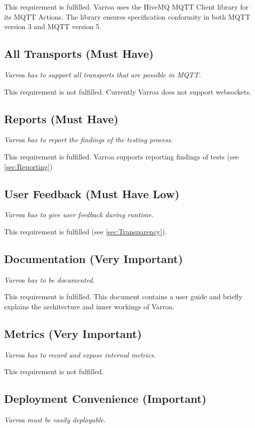 This requirement is fulfilled.
Varroa uses the HiveMQ MQTT Client library for its MQTT Actions.
The library ensures specification conformity in both MQTT version 3 and MQTT version 5.

\subsection{All Transports (Must Have)}
\emph{Varroa has to support all transports that are possible in MQTT.}

This requirement is not fulfilled.
Currently Varroa does not support websockets.

\subsection{Reports (Must Have)}
\emph{Varroa has to report the findings of the testing process.}

This requirement is fulfilled.
Varroa supports reporting findings of tests (see \ref{sec:Reporting})

\subsection{User Feedback (Must Have Low)}
\emph{Varroa has to give user feedback during runtime.}

This requirement is fulfilled (see \ref{sec:Transparency}).

\subsection{Documentation (Very Important)}
\emph{Varroa has to be documented. }

This requirement is fulfilled.
This document contains a user guide and briefly explains the architecture and inner workings of Varroa.

\subsection{Metrics (Very Important)}
\emph{Varroa has to record and expose internal metrics.}

This requirement is not fulfilled.

\subsection{Deployment Convenience (Important)}
\emph{Varroa must be easily deployable.}

